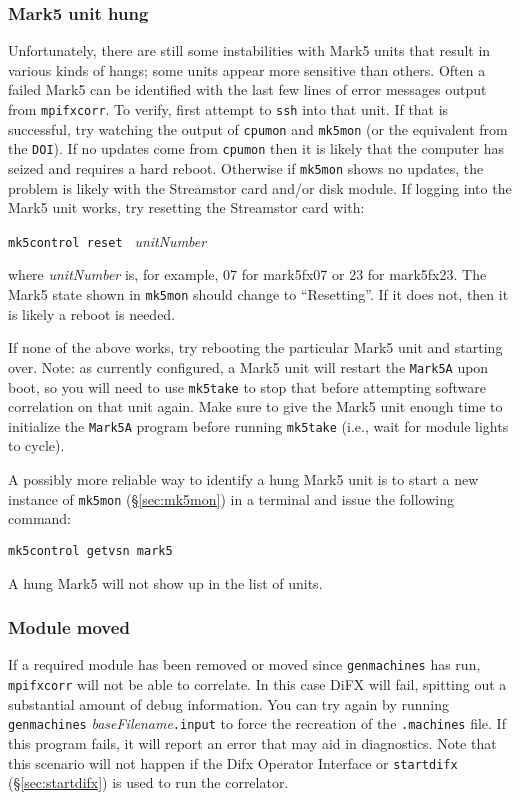 \subsubsection{Mark5 unit hung} %
Unfortunately, there are still some instabilities with Mark5 units that result in various kinds of hangs; some units appear more sensitive than others.
Often a failed Mark5 can be identified with the last few lines of error messages output from {\tt mpifxcorr}.
To verify, first attempt to {\tt ssh} into that unit.
If that is successful, try watching the output of {\tt cpumon} and {\tt mk5mon} (or the equivalent from the {\tt DOI}).
If no updates come from {\tt cpumon} then it is likely that the computer has seized and requires a hard reboot.
Otherwise if {\tt mk5mon} shows no updates, the problem is likely with the Streamstor card and/or disk module.
If logging into the Mark5 unit works, try resetting the Streamstor card with:

{\tt mk5control reset } {\it unitNumber}

\noindent where {\it unitNumber} is, for example, 07 for mark5fx07 or 23 for mark5fx23.
The Mark5 state shown in {\tt mk5mon} should change to ``Resetting''.
If it does not, then it is likely a reboot is needed.

If none of the above works, try rebooting the particular Mark5 unit and starting over.
Note: as currently configured, a Mark5 unit will restart the {\tt Mark5A} upon boot, so you will need to use {\tt mk5take} to stop that before attempting software correlation on that unit again.  
Make sure to give the Mark5 unit enough time to initialize the {\tt Mark5A} program before running {\tt mk5take} (i.e., wait for module lights to cycle).

A possibly more reliable way to identify a hung Mark5 unit is to start a new instance of {\tt mk5mon} (\S\ref{sec:mk5mon}) in a terminal and issue the following command: 

{\tt mk5control getvsn mark5}

\noindent A hung Mark5 will not show up in the list of units.

\subsubsection{Module moved}
If a required module has been removed or moved since {\tt genmachines} has run, {\tt mpifxcorr} will not be able to correlate.
In this case DiFX will fail, spitting out a substantial amount of debug information.
You can try again by running {\tt genmachines} {\em baseFilename}{\tt .input} to force the recreation of the {\tt .machines} file.
If this program fails, it will report an error that may aid in diagnostics.
Note that this scenario will not happen if the Difx Operator Interface or {\tt startdifx} (\S\ref{sec:startdifx}) is used to run the correlator.

